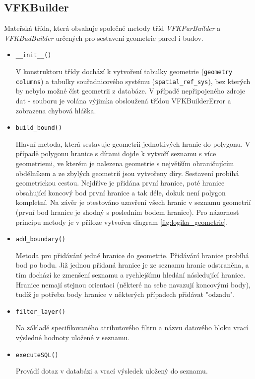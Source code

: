 \subsection{VFKBuilder}
\label{subsec:sestaveni_geometrie}
Mateřská třída, která obsahuje společné metody tříd
\textit{VFKParBuilder} a \textit{VFKBudBuilder} určených pro sestavení
geometrie parcel i budov.
\begin{itemize}[leftmargin=50pt]
\item \verb|__init__()|

V konstruktoru třídy dochází k vytvoření tabulky geometrie
(\verb|geometry columns|) a tabulky souřadnicového systému
(\verb|spatial_ref_sys|), bez kterých by nebylo možné číst geometrii z
databáze. V případě nepřipojeného zdroje dat -  souboru je
volána výjimka obsloužená třídou VFKBuilderError a zobrazena chybová hláška.
\item \verb|build_bound()|

Hlavní metoda, která sestavuje geometrii jednotlivých hranic do polygonu. V
případě polygonu hranice s dírami dojde k vytvoří seznamu s více geometriemi,
ve kterém je nalezena geometrie s největším ohraničujícím obdélníkem a ze zbylých geometrií jsou vytvořeny
díry. Sestavení probíhá geometrickou cestou. Nejdříve je přidána první
hranice, poté hranice obsahující koncový bod první hranice a tak
déle, dokuk není polygon kompletní. Na závěr je otestováno uzavření všech hranic v seznamu
geometrií (první bod hranice je shodný s posledním bodem hranice). Pro
názornost principu metody je v příloze vytvořen
diagram \ref{fig:logika_geometrie}.
\item \verb|add_boundary()|

Metoda pro přidávání jedné hranice do geometrie. Přidávání hranice
probíhá bod po bodu. Již jednou přidaná hranice je ze seznamu hranic odstraněna,
a tím dochází ke zmenšení seznamu a rychlejšímu hledání následující hranice. Hranice nemají stejnou
orientaci (některé na sebe navazují koncovými body), tudíž je potřeba
body hranice v některých případech přidávat "odzadu".
\item \verb|filter_layer()|

Na základě specifikovaného atributového filtru a názvu datového bloku
vrací výsledné hodnoty uložené v seznamu.
\item \verb|executeSQL()|

Provádí  dotaz v databázi a vrací výsledek uložený do seznamu.

\end{itemize}
